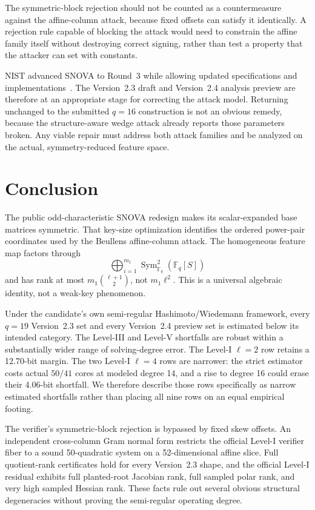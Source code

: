 \documentclass[11pt]{article}
\newcommand{\F}{\mathbb F}
\newcommand{\Sym}{\operatorname{Sym}}
\newcommand{\SNOVA}{\textsf{SNOVA}}
\begin{document}
The symmetric-block rejection should not be counted as a countermeasure against the affine-column attack, because fixed offsets can satisfy it identically.  A rejection rule capable of blocking the attack would need to constrain the affine family itself without destroying correct signing, rather than test a property that the attacker can set with constants.

NIST advanced \SNOVA{} to Round~3 while allowing updated specifications and implementations~\cite{NISTRound3}.  The Version~2.3 draft and Version~2.4 analysis preview are therefore at an appropriate stage for correcting the attack model.  Returning unchanged to the submitted $q=16$ construction is not an obvious remedy, because the structure-aware wedge attack already reports those parameters broken.  Any viable repair must address both attack families and be analyzed on the actual, symmetry-reduced feature space.

\section{Conclusion}\label{sec:conclusion}

The public odd-characteristic \SNOVA{} redesign makes its scalar-expanded base matrices symmetric.  That key-size optimization identifies the ordered power-pair coordinates used by the Beullens affine-column attack.  The homogeneous feature map factors through
\[
 \bigoplus_{i=1}^{m_1}\Sym^2_{\F_q}(\F_q[S])
\]
and has rank at most $m_1\binom{\ell+1}{2}$, not $m_1\ell^2$.  This is a universal algebraic identity, not a weak-key phenomenon.

Under the candidate's own semi-regular Hashimoto/Wiedemann framework, every
$q=19$ Version~2.3 set and every Version~2.4 preview set is estimated below its
intended category.  The Level-III and Level-V shortfalls are robust within a
substantially wider range of solving-degree error.  The Level-I $\ell=2$ row
retains a 12.70-bit margin.  The two Level-I $\ell=4$ rows are narrower: the
strict estimator costs actual $50/41$ cores at modeled degree 14, and a rise to
degree 16 could erase their 4.06-bit shortfall.  We therefore describe those rows
specifically as narrow estimated shortfalls rather than placing all nine rows on
an equal empirical footing.

The verifier's symmetric-block rejection is bypassed by fixed skew offsets.  An
independent cross-column Gram normal form restricts the official Level-I verifier
fiber to a sound 50-quadratic system on a 52-dimensional affine slice.  Full quotient-rank
certificates hold for every Version~2.3 shape, and the official Level-I residual
exhibits full planted-root Jacobian rank, full sampled polar rank, and very high
sampled Hessian rank.  These facts rule out several obvious structural
degeneracies without proving the semi-regular operating degree.
\end{document}
